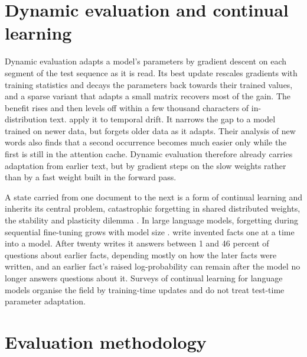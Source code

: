 \documentclass[12pt,a4paper]{report}
\begin{document}
\section{Dynamic evaluation and continual learning}
\label{sec-lit-dyneval}

Dynamic evaluation \citep{krause2018dynamic} adapts a model's parameters by gradient descent on each segment of the test sequence as it is read. Its best update rescales gradients with training statistics and decays the parameters back towards their trained values, and a sparse variant that adapts a small matrix recovers most of the gain. The benefit rises and then levels off within a few thousand characters of in-distribution text. \citet{lazaridou2021mind} apply it to temporal drift. It narrows the gap to a model trained on newer data, but forgets older data as it adapts. Their analysis of new words also finds that a second occurrence becomes much easier only while the first is still in the attention cache. Dynamic evaluation therefore already carries adaptation from earlier text, but by gradient steps on the slow weights rather than by a fast weight built in the forward pass.

A state carried from one document to the next is a form of continual learning and inherits its central problem, catastrophic forgetting in shared distributed weights, the stability and plasticity dilemma \citep{french1999catastrophic}. In large language models, forgetting during sequential fine-tuning grows with model size \citep{li2024revisiting}. \citet{oneill2026continually} write invented facts one at a time into a model. After twenty writes it answers between 1 and 46 percent of questions about earlier facts, depending mostly on how the later facts were written, and an earlier fact's raised log-probability can remain after the model no longer answers questions about it. Surveys of continual learning for language models organise the field by training-time updates \citep{shi2024continual,zheng2024towards} and do not treat test-time parameter adaptation.

\section{Evaluation methodology}
\label{sec-lit-eval}
\end{document}
